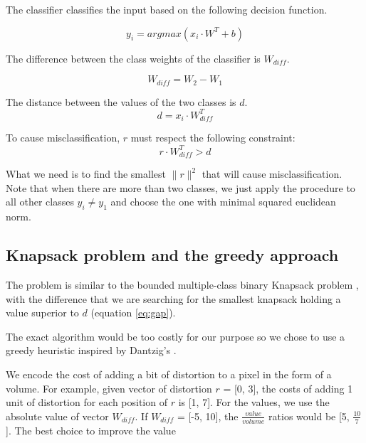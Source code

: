 \documentclass{article} %
\begin{document}
The classifier classifies the input based on the following decision function.

\begin{equation}
\label{eq:decision_function}
  y_i = argmax (x_i \cdot W^T + b)
\end{equation}


The difference between the class weights of the classifier is $W_{diff}$.

\begin{equation}
\label{eq:difference}
  W_{diff} = W_2 - W_1
\end{equation}

The distance between the values of the two classes is $d$.
\begin{equation}
\label{eq:gap}
  d = x_i \cdot W_{diff}^T
\end{equation}


To cause misclassification, $r$ must respect the following constraint:
\begin{equation}
\label{eq:noise_threshold}
  r \cdot W_{diff}^T > d
\end{equation}

What we need is to find the smallest $ \lVert{r} \rVert^2$ that will cause
misclassification. Note that when there are more than two classes, we just
apply the procedure to all other classes $y_i \neq y_1$ and choose the one
with minimal squared euclidean norm.


\subsection{Knapsack problem and the greedy approach}

The problem is similar to the bounded multiple-class binary Knapsack problem
\citep{vanderbeck_extending_2002}, with the difference that we are searching
for the smallest knapsack holding a value superior to $d$ (equation
\ref{eq:gap}).

The exact algorithm would be too costly for our purpose so we chose to use a
greedy heuristic inspired by Dantzig's \citep{dantzig_discrete-variable_1957}.

We encode the cost of adding a bit of distortion to a pixel in the form of a
volume. For example, given vector of distortion $r$ = [0, 3], the costs of
adding 1 unit of distortion for each position of $r$ is [1, 7]. For the values,
we use the absolute value of vector $W_{diff}$. If $W_{diff}$ = [-5, 10], the 
$\frac {value} {volume}$ ratios would be [5, $\frac{10}{7}$]. The best choice
to improve the value 
\end{document}
